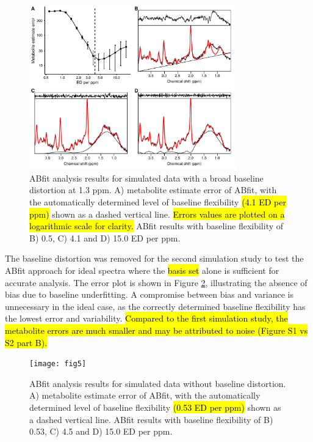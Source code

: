 \documentclass[num-refs]{wiley-article}
\newcommand{\revone}[2]{\hl{#1}\marginnote{\hl{#2}}}
\newcommand{\revonenm}[1]{\hl{#1}} %
\begin{document}
\begin{figure}
  \begin{center}
    \includegraphics[width=0.8\textwidth]{fig4}
    \caption{ABfit analysis results for simulated data with a broad baseline distortion at 1.3 ppm. A) metabolite estimate error of ABfit, with the automatically determined level of baseline flexibility \revonenm{(4.1 ED per ppm)} shown as a dashed vertical line. \revonenm{Errors values are plotted on a logarithmic scale for clarity.} ABfit results with baseline flexibility of B) 0.5, C) 4.1 and D) 15.0 ED per ppm.}
    \label{broad_bl}
  \end{center}
\end{figure}

The baseline distortion was removed for the second simulation study to test the ABfit approach for ideal spectra where the \revone{basis set}{R2.10} alone is sufficient for accurate analysis. The error plot is shown in Figure \ref{flat_bl}, illustrating the absence of bias due to baseline underfitting. A compromise between bias and variance is unnecessary in the ideal case, as the correctly determined baseline flexibility has the lowest error and variability. \revone{Compared to the first simulation study, the metabolite errors are much smaller and may be attributed to noise (Figure S1 vs S2 part B).}{R1.2}

\begin{figure}
  \begin{center}
    \texttt{[image: fig5]}
    \caption{ABfit analysis results for simulated data without baseline distortion. A) metabolite estimate error of ABfit, with the automatically determined level of baseline flexibility \revonenm{(0.53 ED per ppm)} shown as a dashed vertical line. ABfit results with baseline flexibility of B) 0.53, C) 4.5 and D) 15.0 ED per ppm.}
    \label{flat_bl}
  \end{center}
\end{figure}
\end{document}
